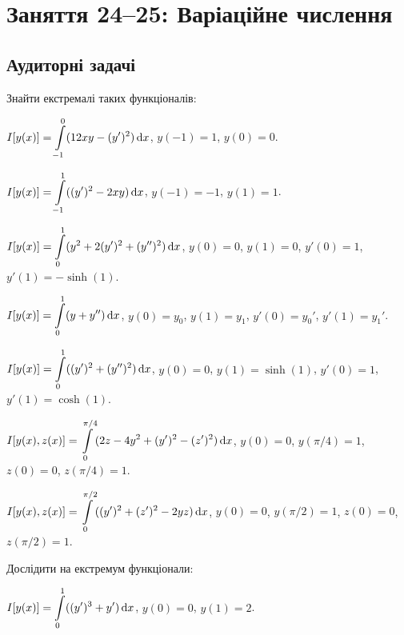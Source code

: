 \section*{Заняття 24--25: Варіаційне числення}

\subsection*{Аудиторні задачі}

Знайти екстремалі таких функціоналів:

\begin{problem}
	$I[y(x)] = \displaystyle\int\limits_{-1}^0 (12 x y - (y')^2) \mathop{}\!\mathrm{d} x$, $y(-1) = 1$, $y(0) = 0$.
\end{problem}

\begin{problem}
	$I[y(x)] = \displaystyle\int\limits_{-1}^1 ((y')^2 - 2 x y) \mathop{}\!\mathrm{d} x$, $y(-1) = -1$, $y(1) = 1$.
\end{problem}

\begin{problem}
	$I[y(x)] = \displaystyle\int\limits_0^1 (y^2 + 2 (y')^2 + (y'')^2) \mathop{}\!\mathrm{d} x$, $y(0) = 0$, $y(1) = 0$, $y'(0) = 1$, $y'(1) = - \sinh (1)$.
\end{problem}

\begin{problem}
	$I[y(x)] = \displaystyle\int\limits_0^1 (y + y'') \mathop{}\!\mathrm{d} x$, $y(0) = y_0$, $y(1) = y_1$, $y'(0) = y_0'$, $y'(1) = y_1'$.
\end{problem}

\begin{problem}
	$I[y(x)] = \displaystyle\int\limits_0^1 ((y')^2 + (y'')^2) \mathop{}\!\mathrm{d} x$, $y(0) = 0$, $y(1) = \sinh (1)$, $y'(0) = 1$, $y'(1) = \cosh (1)$.
\end{problem}

\begin{problem}
	$I[y(x), z(x)] = \displaystyle\int\limits_0^{\pi / 4} (2 z - 4 y^2 + (y')^2 - (z')^2) \mathop{}\!\mathrm{d} x$, $y(0) = 0$, $y(\pi / 4) = 1$, $z(0) = 0$, $z(\pi / 4) = 1$.
\end{problem}

\begin{problem}
	$I[y(x), z(x)] = \displaystyle\int\limits_0^{\pi / 2} ((y')^2 + (z')^2 - 2 y z) \mathop{}\!\mathrm{d} x$, $y(0) = 0$, $y(\pi / 2) = 1$, $z(0) = 0$, $z(\pi / 2) = 1$.
\end{problem}

Дослідити на екстремум функціонали:

\begin{problem}
	$I[y(x)] = \displaystyle\int\limits_0^1 ((y')^3 + y') \mathop{}\!\mathrm{d} x$, $y(0) = 0$, $y(1) = 2$.
\end{problem}

